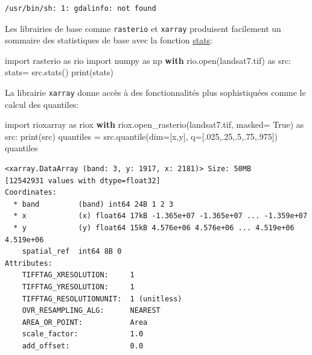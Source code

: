 \documentclass[
  french,
  11pt,
  letterpaper,
  open=any,
  twoside=false,
  french]{scrbook}
\newenvironment{Shaded}{\begin{snugshade}}{\end{snugshade}}
\newcommand{\BuiltInTok}[1]{\textcolor[rgb]{0.00,0.23,0.31}{#1}}
\newcommand{\ControlFlowTok}[1]{\textcolor[rgb]{0.00,0.23,0.31}{\textbf{#1}}}
\newcommand{\FloatTok}[1]{\textcolor[rgb]{0.68,0.00,0.00}{#1}}
\newcommand{\ImportTok}[1]{\textcolor[rgb]{0.00,0.46,0.62}{#1}}
\newcommand{\NormalTok}[1]{\textcolor[rgb]{0.00,0.23,0.31}{#1}}
\newcommand{\OperatorTok}[1]{\textcolor[rgb]{0.37,0.37,0.37}{#1}}
\newcommand{\StringTok}[1]{\textcolor[rgb]{0.13,0.47,0.30}{#1}}
\newcommand{\VariableTok}[1]{\textcolor[rgb]{0.07,0.07,0.07}{#1}}
\begin{document}
\begin{verbatim}
/usr/bin/sh: 1: gdalinfo: not found
\end{verbatim}

Les librairies de base comme \texttt{rasterio} et \texttt{xarray}
produisent facilement un sommaire des statistiques de base avec la
fonction
\href{https://rasterio.readthedocs.io/en/stable/api/rasterio.io.html\#rasterio.io.BufferedDatasetWriter.stats}{stats}:

\begin{Shaded}
\begin{Highlighting}[]
\ImportTok{import}\NormalTok{ rasterio }\ImportTok{as}\NormalTok{ rio}
\ImportTok{import}\NormalTok{ numpy }\ImportTok{as}\NormalTok{ np}
\ControlFlowTok{with}\NormalTok{ rio.}\BuiltInTok{open}\NormalTok{(}\StringTok{\textquotesingle{}landsat7.tif\textquotesingle{}}\NormalTok{) }\ImportTok{as}\NormalTok{ src:}
\NormalTok{    stats}\OperatorTok{=}\NormalTok{ src.stats()}
    \BuiltInTok{print}\NormalTok{(stats)}
\end{Highlighting}
\end{Shaded}

La librairie \texttt{xarray} donne accès à des fonctionnalités plus
sophistiquées comme le calcul des quantiles:

\begin{Shaded}
\begin{Highlighting}[]
\ImportTok{import}\NormalTok{ rioxarray }\ImportTok{as}\NormalTok{ riox}
\ControlFlowTok{with}\NormalTok{ riox.open\_rasterio(}\StringTok{\textquotesingle{}landsat7.tif\textquotesingle{}}\NormalTok{, masked}\OperatorTok{=} \VariableTok{True}\NormalTok{) }\ImportTok{as}\NormalTok{ src:}
    \BuiltInTok{print}\NormalTok{(src)}
\NormalTok{quantiles }\OperatorTok{=}\NormalTok{ src.quantile(dim}\OperatorTok{=}\NormalTok{[}\StringTok{\textquotesingle{}x\textquotesingle{}}\NormalTok{,}\StringTok{\textquotesingle{}y\textquotesingle{}}\NormalTok{], q}\OperatorTok{=}\NormalTok{[}\FloatTok{.025}\NormalTok{,}\FloatTok{.25}\NormalTok{,}\FloatTok{.5}\NormalTok{,}\FloatTok{.75}\NormalTok{,}\FloatTok{.975}\NormalTok{])}
\NormalTok{quantiles}
\end{Highlighting}
\end{Shaded}

\begin{verbatim}
<xarray.DataArray (band: 3, y: 1917, x: 2181)> Size: 50MB
[12542931 values with dtype=float32]
Coordinates:
  * band         (band) int64 24B 1 2 3
  * x            (x) float64 17kB -1.365e+07 -1.365e+07 ... -1.359e+07
  * y            (y) float64 15kB 4.576e+06 4.576e+06 ... 4.519e+06 4.519e+06
    spatial_ref  int64 8B 0
Attributes:
    TIFFTAG_XRESOLUTION:     1
    TIFFTAG_YRESOLUTION:     1
    TIFFTAG_RESOLUTIONUNIT:  1 (unitless)
    OVR_RESAMPLING_ALG:      NEAREST
    AREA_OR_POINT:           Area
    scale_factor:            1.0
    add_offset:              0.0
\end{verbatim}
\end{document}

